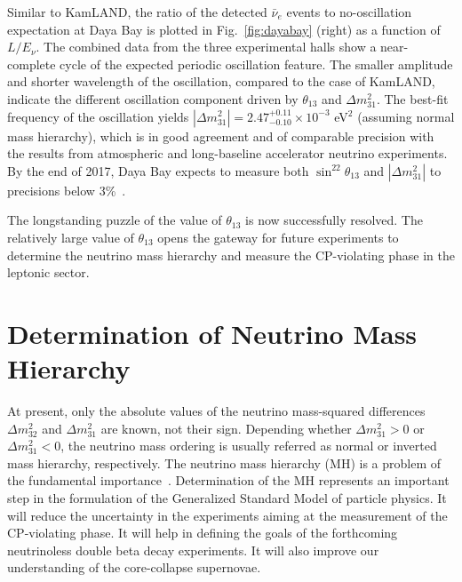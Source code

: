 \documentclass[aps,twocolumn,preprintnumbers,amsmath,superscriptaddress,amssymb,floats,nofootinbib]{revtex4-1}
\begin{document}
Similar to KamLAND, the ratio of the detected $\bar\nu_{e}$ events to no-oscillation expectation at Daya Bay is plotted in Fig.~\ref{fig:dayabay} (right) as a function of $L/E_{\nu}$. 
The combined data from the three experimental halls show a near-complete cycle of the expected periodic oscillation feature. 
The smaller amplitude and shorter wavelength of the oscillation, compared to the case of KamLAND, indicate the different oscillation component driven by $\theta_{13}$ and $\Delta{m}^2_{31}$. 
The best-fit frequency of the oscillation yields $|\Delta{m}^2_{31}| = 2.47^{+0.11}_{-0.10} \times 10^{-3}$ eV$^2$ (assuming normal mass hierarchy), which is in good agreement and of comparable precision with the results from atmospheric and long-baseline accelerator neutrino experiments. 
By the end of 2017, Daya Bay expects to measure both $\sin^22\theta_{13}$ and $|\Delta{m}^2_{31}|$ to precisions below 3\%~\cite{Zhang-Neutrino14}.

The longstanding puzzle of the value of $\theta_{13}$ is now successfully resolved.
The relatively large value of $\theta_{13}$ opens the gateway for future experiments to determine the neutrino mass hierarchy and measure the CP-violating phase in the leptonic sector.


\section{Determination of Neutrino Mass Hierarchy}

At present, only the absolute values of the neutrino mass-squared differences $\Delta m^2_{32}$ and $\Delta m^2_{31}$ are known, not their sign. 
Depending whether $\Delta m^2_{31}>0$ or $\Delta m^2_{31}<0$, the neutrino mass ordering is usually referred as normal or inverted mass hierarchy, respectively. 
The neutrino mass hierarchy (MH) is a problem of the fundamental importance~\cite{MHwhitepaper}.
Determination of the MH represents an important step in the formulation of the Generalized Standard Model of particle physics. 
It will reduce the uncertainty in the experiments aiming at the measurement of the CP-violating phase. 
It will help in defining the goals of the forthcoming neutrinoless double beta decay experiments.
It will also improve our understanding of the core-collapse supernovae.
\end{document}
